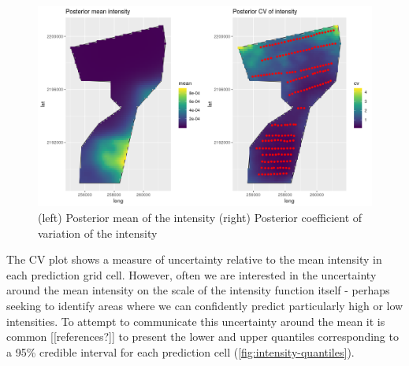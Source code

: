 \documentclass[preprint,12pt]{elsarticle}
\begin{document}
\begin{figure}
	\includegraphics[scale=0.5]{figures/intensity_mean_cv.png}
	\caption{(left) Posterior mean of the intensity (right) Posterior coefficient of variation of the intensity}
	\label{fig:intensity-mean-cv}
\end{figure}

The CV plot shows a measure of uncertainty relative to the mean intensity in each prediction grid cell.  However, often we are interested in the uncertainty around the mean intensity on the scale of the intensity function itself - perhaps seeking to identify areas where we can confidently predict particularly high or low intensities.  To attempt to communicate this uncertainty around the mean it is common [[references?]] to present the lower and upper quantiles corresponding to a 95\% credible interval for each prediction cell (\autoref{fig:intensity-quantiles}).
\end{document}
